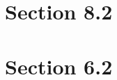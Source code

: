 \documentclass{beamer}
\begin{document}
%
%
%
%
%
%

%
%
%
%
%
%

%

%
\section{Section 8.2}
%


\section{}


\section{Section 6.2}

\end{document}
